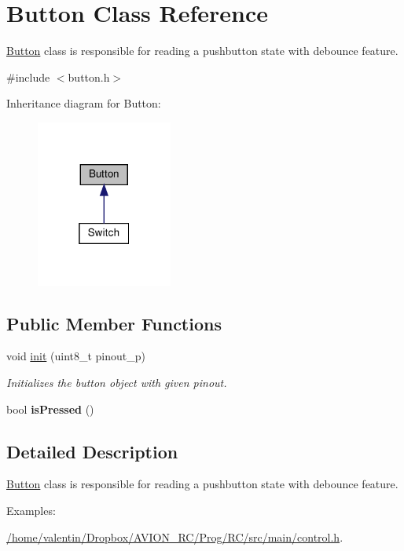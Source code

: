 \hypertarget{class_button}{}\section{Button Class Reference}
\label{class_button}


\hyperlink{class_button}{Button} class is responsible for reading a pushbutton state with debounce feature.  




{\ttfamily \#include $<$button.\+h$>$}



Inheritance diagram for Button\+:\nopagebreak
\begin{figure}[H]
\begin{center}
\leavevmode
\includegraphics[width=127pt]{class_button__inherit__graph}
\end{center}
\end{figure}
\subsection*{Public Member Functions}
\begin{DoxyCompactItemize}
\item 
void \hyperlink{class_button_a5768906065b7f1d4d146f1d9fc5ce890}{init} (uint8\+\_\+t pinout\+\_\+p)
\begin{DoxyCompactList}\small\item\em Initializes the button object with given pinout. \end{DoxyCompactList}\item 
\mbox{\label{class_button_a143f0a274b03d2bede8a84e37cd43dc7}} 
bool {\bfseries is\+Pressed} ()
\end{DoxyCompactItemize}


\subsection{Detailed Description}
\hyperlink{class_button}{Button} class is responsible for reading a pushbutton state with debounce feature. \begin{Desc}
\item[Examples\+: ]\par
\hyperlink{_2home_2valentin_2_dropbox_2_a_v_i_o_n__r_c_2_prog_2_r_c_2src_2main_2control_8h-example}{/home/valentin/\+Dropbox/\+A\+V\+I\+O\+N\+\_\+\+R\+C/\+Prog/\+R\+C/src/main/control.\+h}.\end{Desc}


